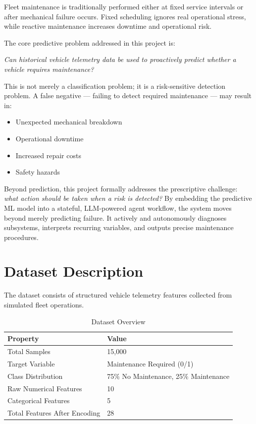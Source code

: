 \documentclass[12pt, a4paper]{article}
\begin{document}
Fleet maintenance is traditionally performed either at fixed service intervals or after mechanical failure occurs. Fixed scheduling ignores real operational stress, while reactive maintenance increases downtime and operational risk.

The core predictive problem addressed in this project is:

\textit{Can historical vehicle telemetry data be used to proactively predict whether a vehicle requires maintenance?}

This is not merely a classification problem; it is a risk-sensitive detection problem. A false negative — failing to detect required maintenance — may result in:

\begin{itemize}
\item Unexpected mechanical breakdown
\item Operational downtime
\item Increased repair costs
\item Safety hazards
\end{itemize}

Beyond prediction, this project formally addresses the prescriptive challenge: \textit{what action should be taken when a risk is detected?} By embedding the predictive ML model into a stateful, LLM-powered agent workflow, the system moves beyond merely predicting failure. It actively and autonomously diagnoses subsystems, interprets recurring variables, and outputs precise maintenance procedures.

\section{Dataset Description}

The dataset consists of structured vehicle telemetry features collected from simulated fleet operations.

\begin{table}[H]
\centering
\caption{Dataset Overview}
\begin{tabular}{ll}
\toprule
Property & Value \\
\midrule
Total Samples & 15,000 \\
Target Variable & Maintenance Required (0/1) \\
Class Distribution & 75\% No Maintenance, 25\% Maintenance \\
Raw Numerical Features & 10 \\
Categorical Features & 5 \\
Total Features After Encoding & 28 \\
\bottomrule
\end{tabular}
\end{table}
\end{document}
